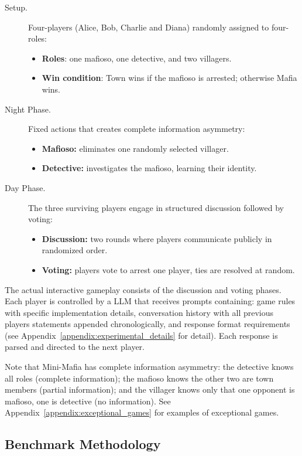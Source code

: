 \documentclass{article}
\begin{document}
\begin{description}
  \item[Setup.] Four-players (Alice, Bob, Charlie and Diana) randomly assigned to four-roles:
  \begin{itemize}
    \item \textbf{Roles}: one mafioso, one detective, and two villagers.
    \item \textbf{Win condition}: Town wins if the mafioso is arrested; otherwise Mafia wins.
  \end{itemize}

  
  \item[Night Phase.] Fixed actions that creates complete information asymmetry:
  \begin{itemize}
    \item \textbf{Mafioso:} eliminates one randomly selected villager.
    \item \textbf{Detective:} investigates the mafioso, learning their identity.
  \end{itemize}
  
  \item[Day Phase.] The three surviving players engage in structured discussion followed by voting:
  \begin{itemize}
    \item \textbf{Discussion:} two rounds where players communicate publicly in randomized order.
    \item \textbf{Voting:} players vote to arrest one player, ties are resolved at random.
  \end{itemize}
\end{description}
The actual interactive gameplay consists of the discussion and voting phases. Each player is controlled by a LLM that receives prompts containing: game rules with specific implementation details, conversation history with all previous players statements appended chronologically, and response format requirements (see Appendix~\ref{appendix:experimental_details} for detail). Each response is parsed and directed to the next player.

Note that Mini-Mafia has complete information asymmetry: the detective knows all roles (complete information); the mafioso knows the other two are town members (partial information); and the villager knows only that one opponent is mafioso, one is detective (no information). See Appendix~\ref{appendix:exceptional_games} for examples of exceptional games.


\subsection{Benchmark Methodology}
\end{document}
